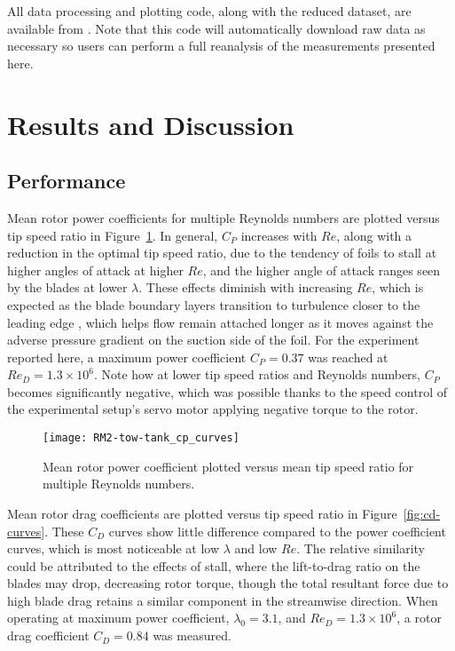All data processing and plotting code, along with the reduced dataset, are
available from \cite{Bachant2016-RM2-data}. Note that this code will
automatically download raw data as necessary so users can perform a full
reanalysis of the measurements presented here.


\section{Results and Discussion}

\subsection{Performance}

Mean rotor power coefficients for multiple Reynolds numbers are plotted versus
tip speed ratio in Figure~\ref{fig:cp-curves}. In general, $C_P$ increases with
$Re$, along with a reduction in the optimal tip speed ratio, due to the tendency
of foils to stall at higher angles of attack at higher $Re$, and the higher
angle of attack ranges seen by the blades at lower $\lambda$. These effects
diminish with increasing $Re$, which is expected as the blade boundary layers
transition to turbulence closer to the leading edge \cite{Lissaman1983,
    McMasters1980, Bachant2016-RVAT-Re-dep}, which helps flow remain attached longer
as it moves against the adverse pressure gradient on the suction side of the
foil. For the experiment reported here, a maximum power coefficient $C_P=0.37$
was reached at $Re_D=1.3 \times 10^6$. Note how at lower tip speed ratios and
Reynolds numbers, $C_P$ becomes significantly negative, which was possible
thanks to the speed control of the experimental setup's servo motor applying
negative torque to the rotor.

\begin{figure}
    \texttt{[image: RM2-tow-tank\_cp\_curves]}
    
    \caption{Mean rotor power coefficient plotted versus mean tip speed ratio
        for multiple Reynolds numbers.}
    
    \label{fig:cp-curves}
\end{figure}

Mean rotor drag coefficients are plotted versus tip speed ratio in
Figure~\ref{fig:cd-curves}. These $C_D$ curves show little difference compared to
the power coefficient curves, which is most noticeable at low $\lambda$ and low
$Re$. The relative similarity could be attributed to the effects of stall, where
the lift-to-drag ratio on the blades may drop, decreasing rotor torque, though
the total resultant force due to high blade drag retains a similar component in
the streamwise direction. When operating at maximum power coefficient,
$\lambda_0=3.1$, and $Re_D=1.3 \times 10^6$, a rotor drag coefficient $C_D=0.84$
was measured.

